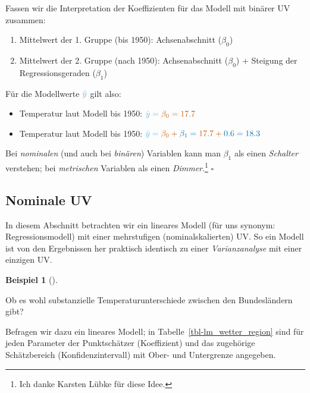 \documentclass[
  letterpaper,
  twoside,
  open=any]{scrbook}
\providecommand{\tightlist}{%
  \setlength{\itemsep}{0pt}\setlength{\parskip}{0pt}}\usepackage{longtable,booktabs,array}
\theoremstyle{definition}
\theoremstyle{definition}
\newtheorem{example}{Beispiel}[chapter]
\theoremstyle{definition}
\theoremstyle{remark}
\begin{document}
Fassen wir die Interpretation der Koeffizienten für das Modell mit
binärer UV zusammen:

\begin{enumerate}
\def\labelenumi{\arabic{enumi}.}
\tightlist
\item
  Mittelwert der 1. Gruppe (bis 1950): {Achsenabschnitt (\(\beta_0\))}
\item
  Mittelwert der 2. Gruppe (nach 1950): {Achsenabschnitt (\(\beta_0\))}
  + {Steigung der Regressionsgeraden (\(\beta_1\))}
\end{enumerate}

Für die Modellwerte \(\color{modelcol}{\hat{y}}\) gilt also:

\begin{itemize}
\item
  Temperatur laut Modell bis 1950:
  \(\color{modelcol}{\hat{y}} = \color{beta0col}{\beta_0} = 17.7\)
\item
  Temperatur laut Modell bis 1950:
  \(\color{modelcol}{\hat{y}} = \color{beta0col}{\beta_0} +  \color{beta1col}{\beta_1}= \color{beta0col}{17.7} + \color{beta1col}{0.6} = 18.3\)
\end{itemize}

Bei \emph{nominalen} (und auch bei \emph{binären}) Variablen kann man
\({\beta_1}\) als einen \emph{Schalter} verstehen; bei \emph{metrischen}
Variablen als einen \emph{Dimmer}.\footnote{Ich danke Karsten Lübke für
  diese Idee.} \(\square\)

\subsection{Nominale UV}\label{nominale-uv}

In diesem Abschnitt betrachten wir ein lineares Modell (für uns synonym:
Regressionsmodell) mit einer mehrstufigen (nominalskalierten) UV. So ein
Modell ist von den Ergebnissen her praktisch identisch zu einer
\emph{Varianzanalyse} mit einer einzigen UV.

\begin{example}[]\protect\hypertarget{exm-wetter2}{}\label{exm-wetter2}

Ob es wohl substanzielle Temperaturunterschiede zwischen den
Bundesländern gibt?

\end{example}

Befragen wir dazu ein lineares Modell; in
Tabelle~\ref{tbl-lm_wetter_region} sind für jeden Parameter der
Punktschätzer (Koeffizient) und das zugehörige Schätzbereich
(Konfidenzintervall) mit Ober- und Untergrenze angegeben.
\end{document}
